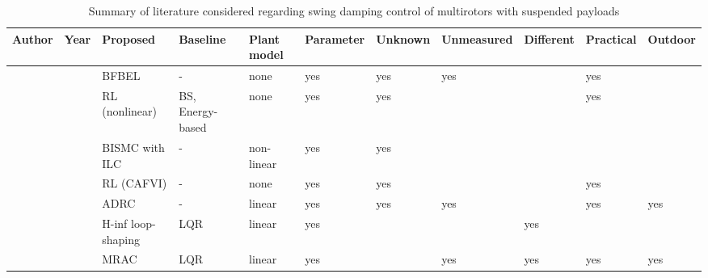 \begin{landscape}
\begin{tiny}
\begin{table}[!htbp]
    \renewcommand{\arraystretch}{1.1}
    \centering
    \caption{Summary of literature considered regarding swing damping control of multirotors with suspended payloads}
    \begin{tabularx}{\linewidth}{@{}lllllllllll@{}}
        \toprule
            \textbf{Author}              & \textbf{Year}                   & \textbf{Proposed}          & \textbf{Baseline}      & \textbf{Plant model} & \textbf{Parameter} & \textbf{Unknown} & \textbf{Unmeasured} & \textbf{Different} & \textbf{Practical} & \textbf{Outdoor} \\
        \midrule
            \citet{Muthusamy2021}       & \citeyear{Muthusamy2021}       & \gls{BFBEL}                & -                      & none                 & yes                & yes              & yes                 &                    & yes                &                  \\
            \citet{Hua2021}              & \citeyear{Hua2021}              & \gls{RL} (nonlinear)       & \gls{BS}, Energy-based & none                 & yes                & yes              &                     &                    & yes                &                  \\
            \citet{Allahverdy2021}       & \citeyear{Allahverdy2021}       & \gls{BISMC} with \gls{ILC} & -                      & non-linear           & yes                & yes              &                     &                    &                    &                  \\
            \citet{Faust2014}            & \citeyear{Faust2014}            & \gls{RL} (\gls{CAFVI})     & -                      & none                 & yes                & yes              &                     &                    & yes                &                  \\
            \citet{Wang2020}             & \citeyear{Wang2020}             & \gls{ADRC}                 & -                      & linear               & yes                & yes              & yes                 &                    & yes                & yes              \\
            \citet{Taylor2020}           & \citeyear{Taylor2020}           & \gls{H-inf} loop-shaping   & \gls{LQR}              & linear               & yes                &                  &                     & yes                &                    &                  \\
            \citet{Erasmus2020}          & \citeyear{Erasmus2020}          & \gls{MRAC}                 & \gls{LQR}              & linear               & yes                &                  & yes                 & yes                & yes                & yes              \\

\end{tabularx}
\end{table}
\end{tiny}
\end{landscape}
